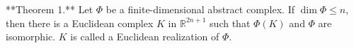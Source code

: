 **Theorem 1.** Let $\Phi$ be a finite-dimensional abstract complex. If $\dim \Phi \leqslant n$, then there is a Euclidean complex $K$ in $\mathbb{R}^{2n+1}$ such that $\Phi(K)$ and $\Phi$ are isomorphic. $K$ is called a Euclidean realization of $\Phi$.
